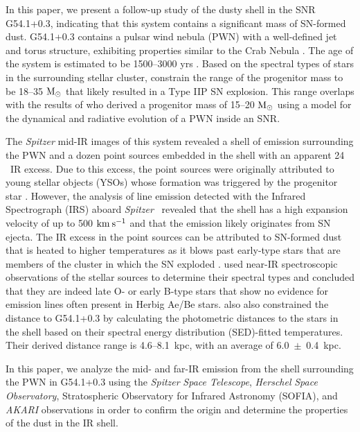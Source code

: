 \documentclass{emulateapj}
\newcommand{\spitzer}{\textit{Spitzer }}
\newcommand{\herschel}{\textit{Herschel }}
\begin{document}
In this paper, we present a follow-up study of the dusty shell in the SNR G54.1+0.3, indicating that this system contains a significant mass of SN-formed dust. G54.1+0.3 contains a pulsar wind nebula (PWN) with a well-defined jet and torus structure, exhibiting properties similar to the Crab Nebula \citep{lu01,temim10}. The age of the system is estimated to be 1500--3000 yrs \citep{chevalier05,bocchino10,gelfand15}. Based on the spectral types of stars in the surrounding stellar cluster, \citet{kim13} constrain the range of the progenitor mass to be 18--35 $\rm M_{\odot}$ that likely resulted in a Type IIP SN explosion. This range overlaps with the results of \citet{gelfand15} who derived a progenitor mass of 15--20 $\rm M_{\odot}$ using a model for the dynamical and radiative evolution of a PWN inside an SNR.


The \spitzer mid-IR images of this system revealed a shell of emission surrounding the PWN and a dozen point sources embedded in the shell with an apparent 24 \micron\ IR excess. Due to this excess, the point sources were originally attributed to young stellar objects (YSOs) whose formation was triggered by the progenitor star \citep{koo08}. However, the analysis of line emission detected with the Infrared Spectrograph (IRS) aboard \spitzer\ revealed that the shell has a high expansion velocity of up to 500 $\rm km \: s^{-1}$ and that the emission likely originates from SN ejecta. The IR excess in the point sources can be attributed to SN-formed dust that is heated to higher temperatures as it blows past early-type stars that are members of the cluster in which the SN exploded \citep{temim10}. \citet{kim13} used near-IR spectroscopic observations of the stellar sources to determine their spectral types and concluded that they are indeed late O- or early B-type stars that show no evidence for emission lines often present in Herbig Ae/Be stars. 
 \citet{kim13} also also constrained the distance to G54.1+0.3 by calculating the photometric distances to the stars in the shell based on their  spectral energy distribution (SED)-fitted temperatures. Their derived distance range is 4.6--8.1~kpc, with an average of 6.0~$\pm$~0.4~kpc.
 
In this paper, we analyze the mid- and far-IR emission from the shell surrounding the PWN in G54.1+0.3 using the \spitzer \textit{Space Telescope}, \herschel \textit{Space Observatory}, Stratospheric Observatory for Infrared Astronomy (SOFIA), and \textit{AKARI} observations in order to confirm the origin and determine the properties of the dust in the IR shell. 
\end{document}
